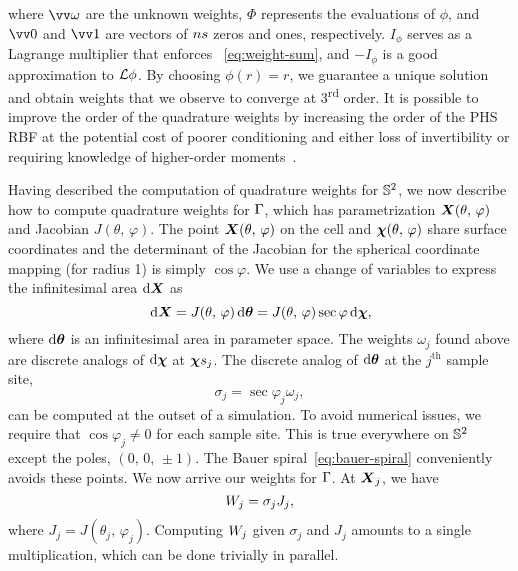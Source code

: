 where $\arr{\omega}$ are the unknown weights, $\Phi$ represents the evaluations of
$\phi$, and $\arr{0}$ and $\arr{1}$ are vectors of $\sample\cardinality$ zeros and ones,
respectively. $I_{\phi}$ serves as a Lagrange multiplier that enforces~%
\eqref{eq:weight-sum}, and $-I_\phi$ is a good approximation to $\mathcal{L}\phi$. By choosing
$\phi(r) = r$, we guarantee a unique solution and obtain weights that we observe to
converge at 3\textsuperscript{rd} order. It is possible to improve the order of the
quadrature weights by increasing the order of the PHS RBF at the potential cost of poorer
conditioning and either loss of invertibility or requiring knowledge of higher-order
moments~\cite{Fuselier:2013coba}.

Having described the computation of quadrature weights for $\mathbb{S}^2$, we now
describe how to compute quadrature weights for $\Gamma$, which has parametrization
$\boldsymbol{X}(\theta,\,\varphi)$ and Jacobian $J(\theta,\,\varphi)$. The point
$\boldsymbol{X}(\theta,\,\varphi)$ on the cell and $\boldsymbol{\chi}(\theta,\,\varphi)$ share surface coordinates
and the determinant of the Jacobian for the spherical coordinate mapping (for radius 1)
is simply $\cos\varphi$.  We use a change of variables to express the infinitesimal area
$\d\X$ as
\begin{equation}\label{eq:quad-cov}
    \d\X
    = J(\theta,\,\varphi)\d\qs
    = J(\theta,\,\varphi)\sec\varphi\d\Xp,
\end{equation}
where $\d\qs$ is an infinitesimal area in parameter space. The weights $\omega_j$ found
above are discrete analogs of $\d\Xp$ at $\sample\Xp_j$. The discrete analog of $\d\qs$
at the $j^\text{th}$ sample site,
\begin{equation*}
    \sigma_j=\sec\varphi_j\omega_j,
\end{equation*}
can be computed at the outset of a simulation. To avoid numerical issues, we require that
$\cos\varphi_j \neq 0$ for each sample site. This is true everywhere on $\mathbb{S}^2$ except
the poles, $(0,\,0,\,\pm1)$. The Bauer spiral~\eqref{eq:bauer-spiral} conveniently avoids
these points. We now arrive our weights for $\Gamma$. At $\boldsymbol{X}_j$, we have
\begin{equation}
    \weight[j] = \sigma_j J_j,
\end{equation}
where $J_j = J(\theta_j,\,\varphi_j)$. Computing $\weight[j]$ given $\sigma_j$ and $J_j$
amounts to a single multiplication, which can be done trivially in parallel.

